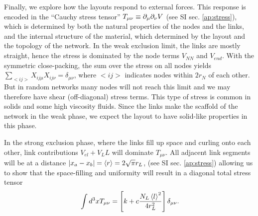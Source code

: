 \documentclass[nofootinbib,preprint,floatfix,endfloats]{revtex4} %
\begin{document}

Finally, we explore
how the layouts respond to external forces. This response is encoded in the ``Cauchy stress tensor'' $T_{\mu\nu} \equiv \partial_\mu\partial_\nu V$ \cite{irgens2008continuum} (see SI sec. \ref{ap:stress}), which is determined by both the natural properties of the nodes and the links, and 
the internal structure of the material, which determined by the layout and the topology of the network. 
In the weak exclusion limit, the links are mostly straight, hence the stress is dominated by the node terms $V_{NN}$ and $V_{end}$. 
With the symmetric close-packing, the sum over the stress on all nodes yields $\sum_{<ij>} X_{ij\mu}X_{ij\nu} = \delta_{\mu\nu}$, where $<ij>$ indicates nodes within $2r_N$ of each other. 
But in random networks many nodes will not reach this limit and we may therefore have shear (off-diagonal) stress terms. This type of stress is common in solids and some high viscosity fluids. Since the links make the scaffold of the network in the weak phase, we expect the layout to have solid-like properties in this phase.  

In the strong exclusion phase, where the links fill up space and curling onto each other,
link contributions $V_{el}+V_LL$ will dominate $T_{\mu\nu}$. All adjacent link segments will be at a distance $|x_a-x_b| = \left<r\right> = 2\sqrt{\pi} r_L$,
 (see SI sec. \ref{ap:stress}) allowing us to show that the space-filling and uniformity will result in a diagonal total stress tensor %
\begin{equation}
    \mbox{}\int d^3x  T_{\mu\nu} = \left[ k + c{N_L \left<l\right>^2\over 4r_L^2}   \right]\delta_{\mu\nu} \label{eq:Tstrong}
.\end{equation}
\end{document}
